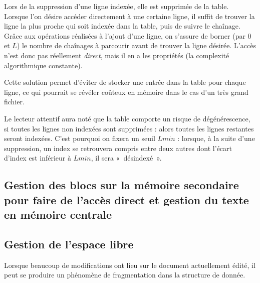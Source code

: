 Lors de la suppression d'une ligne indexée, elle est supprimée de la table.\\

Lorsque l'on désire accéder directement à une certaine ligne, il suffit de trouver la ligne la plus proche qui soit indexée dans la table, puis de suivre le chaînage. Grâce aux opérations réalisées à l'ajout d'une ligne, on s'assure de borner (par $0$ et $L$) le nombre de chaînages à parcourir avant de trouver la ligne désirée. L'accès n'est donc pas réellement \emph{direct}, mais il en a les propriétés (la complexité algorithmique constante).

Cette solution permet d'éviter de stocker une entrée dans la table pour chaque ligne, ce qui pourrait se révéler coûteux en mémoire dans le cas d'un très grand fichier. 

Le lecteur attentif aura noté que la table comporte un risque de dégénérescence, si toutes les lignes non indexées sont supprimées : alors toutes les lignes restantes seront indexées. C'est pourquoi on fixera un seuil $Lmin$ : lorsque, à la suite d'une suppression, un index se retrouvera compris entre deux autres dont l'écart d'index est inférieur à $Lmin$, il sera «~désindexé~». 


\subsection{Gestion des blocs sur la mémoire secondaire pour faire de l'accès
    direct et gestion du texte en mémoire centrale}
	\label{subsec:gestionblocs}

\subsection{Gestion de l'espace libre}
	\label{subsec:gestionespacelibre}
Lorsque beaucoup de modifications ont lieu sur le document actuellement édité,
il peut se produire un phénomène de fragmentation dans la structure de
donnée.

